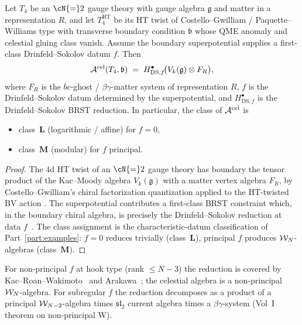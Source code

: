 \begin{proposition}[Celestial chiral algebra of $\cN{=}2$ gauge theory
via DS; \ClaimStatusConditional]
\label{prop:uch-ds-matter}
Let $T_4$ be an $\cN{=}2$ gauge theory with gauge algebra
$\mathfrak g$ and matter in a representation $R$, and let
$T_4^{\mathrm{HT}}$ be its HT twist of Costello--Gwilliam /
Paquette--Williams type with transverse boundary condition
$\mathfrak b$ whose QME anomaly and celestial gluing class vanish.
Assume the boundary superpotential supplies a first-class
Drinfeld--Sokolov datum $f$. Then
\[
\mathcal A^{\mathrm{cel}}(T_4,\mathfrak b) \;=\; H^\bullet_{\mathrm{DS},f}\!\bigl(V_k(\mathfrak g)
\otimes F_R\bigr),
\]
where $F_R$ is the $bc$-ghost / $\beta\gamma$-matter system of
representation $R$, $f$ is the Drinfeld--Sokolov datum determined by
the superpotential, and $H^\bullet_{\mathrm{DS},f}$ is the
Drinfeld--Sokolov BRST reduction. In particular, the class of
$\mathcal A^{\mathrm{cel}}$ is
\begin{itemize}
\item class~$\mathbf L$ (logarithmic / affine) for $f = 0$,
\item class~$\mathbf M$ (modular) for $f$ principal.
\end{itemize}
\end{proposition}

\begin{proof}
The $4$d HT twist of an $\cN{=}2$ gauge theory has boundary the
tensor product of the Kac--Moody algebra $V_k(\mathfrak g)$ with a
matter vertex algebra $F_R$, by Costello--Gwilliam's chiral
factorization quantization applied to the HT-twisted BV action
\cite{CostelloGwilliamVolI, CostelloGwilliamVolII}. The
superpotential contributes a first-class BRST constraint which, in
the boundary chiral algebra, is precisely the Drinfeld--Sokolov
reduction at data $f$~\cite[\S 5]{PaquetteWilliamsHT}. The class
assignment is the characteristic-datum classification of
Part~\ref{part:examples}: $f=0$ reduces trivially (class~$\mathbf L$),
principal $f$ produces $\mathcal W_N$-algebras (class~$\mathbf M$).
\end{proof}

\begin{remark}
\label{rem:uch-ds-hook}
For non-principal $f$ at hook type (rank $\leq N-3$) the reduction
is covered by Kac--Roan--Wakimoto~\cite{KRW03} and
Arakawa~\cite{Ara07}; the celestial algebra is a non-principal
$\mathcal W_N$-algebra. For subregular $f$ the reduction decomposes as a
product of a principal $\mathcal W_{N-2}$-algebra times $\mathfrak{sl}_2$
current algebra times a $\beta\gamma$-system (Vol~I theorem on
non-principal W).
\end{remark}

